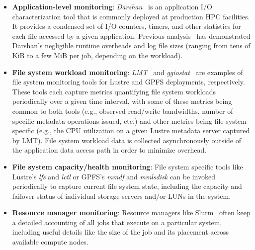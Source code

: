 \begin{itemize}[leftmargin=*]
\item \textbf{Application-level monitoring}: \textit{Darshan}~\cite{Carns2009} is an application I/O characterization tool that is commonly deployed at production HPC facilities. It provides a condensed set of I/O counters, timers, and other statistics for each file accessed by a given application. Previous analysis~\cite{snyder2016performance} has demonstrated Darshan's negligible runtime overheads and log file sizes (ranging from tens of KiB to a few MiB per job, depending on the workload).

\item \textbf{File system workload monitoring}: \textit{LMT}~\cite{lmt} and \textit{ggiostat}~\cite{Lockwood2017} are examples of 
file system monitoring tools for Lustre and GPFS deployments, respectively.
These tools each capture metrics quantifying file system workloads
periodically over a given time interval, with some of these metrics being
common to both tools (e.g., observed read/write bandwidths, number of
specific metadata operations issued, etc.) and other metrics being file
system specific (e.g., the CPU utilization on a given Lustre metadata server
captured by LMT).  File system workload data is collected asynchronously
outside of the application data access path in order to minimize overhead.

\item \textbf{File system capacity/health monitoring}: File system specific tools like Lustre's \textit{lfs} and \textit{lctl} or GPFS's \textit{mmdf} and \textit{mmlsdisk} can be invoked periodically to capture current file system state, including the capacity and failover status of individual storage servers and/or LUNs in the system.

\item \textbf{Resource manager monitoring}: Resource managers like Slurm~\cite{2003slurm} often keep a detailed accounting of all jobs that execute on a particular system, including useful details like the size of the job and its placement across available compute nodes.
\end{itemize}

